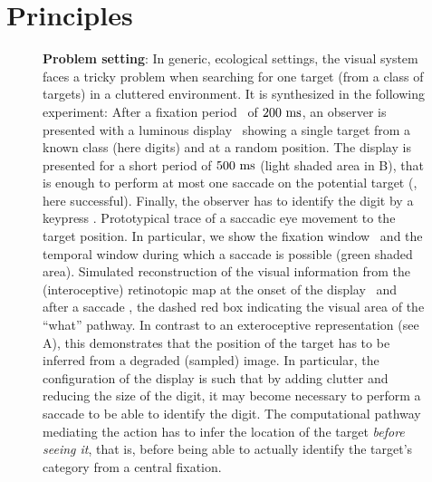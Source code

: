 \section{Principles}
\label{sec:principles}

\begin{figure}[t!]%
	\caption{%
		{\bf Problem setting}: In generic, ecological settings, the visual system faces a tricky problem when searching for one target (from a class of targets) in a cluttered environment. It is synthesized in the following experiment: %
		\A After a fixation period \FIX\ of $200~\si{\milli\second}$, an observer is presented with a luminous display \DIS\ showing a single target from a known class (here digits) and at a random position. The display is presented for a short period of $500~\si{\milli\second}$ (light shaded area in B), that is enough to perform at most one saccade on the potential target (\SAC , here successful). Finally, the observer has to identify the digit by a keypress \ANS . %
		\B Prototypical trace of a saccadic eye movement to the target position. In particular, we show the fixation window \FIX\ and the temporal window during which a saccade is possible (green shaded area). %
		\C Simulated reconstruction of the visual information from the (interoceptive) retinotopic map at the onset of the display \DIS\ and after a saccade \SAC , the dashed red box indicating the visual area of the ``what'' pathway. In contrast to an exteroceptive representation (see A), this demonstrates that the position of the target has to be inferred from a degraded (sampled) image. In particular, the configuration of the display is such that by adding clutter and reducing the size of the digit, it may become necessary to perform a saccade to be able to identify the digit. The computational pathway mediating the action has to infer the location of the target \emph{before seeing it}, that is, before being able to actually identify the target's category from a central fixation. %
		\label{fig:intro}}%
\end{figure}%

